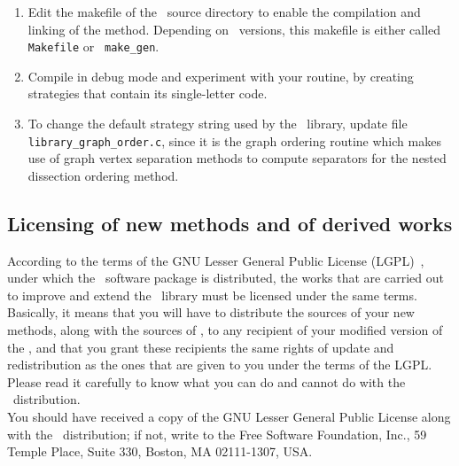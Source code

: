 \begin{enumerate}
\item
Edit the makefile of the \libscotch\ source directory to enable the
compilation and linking of the method. Depending on \libscotch\
versions, this makefile is either called {\tt Makefile} or {\tt
make\_\lbt gen}.
\item
Compile in debug mode and experiment with your routine, by creating
strategies that contain its single-letter code.
\item
To change the default strategy string used by the \libscotch\ library,
update file {\tt library\_\lbt graph\_\lbt order.c}, since it is
the graph ordering routine which makes use of graph vertex separation
methods to compute separators for the nested dissection ordering method.
\end{enumerate}

\subsection{Licensing of new methods and of derived works}

According to the terms of the GNU Lesser General Public License
(LGPL)~\cite{lgpl}, under which the \scotch\ software package is
distributed, the works that are carried out to improve and
extend the \libscotch\ library must be licensed under the same
terms. Basically, it means that you will have to distribute the
sources of your new methods, along with the sources of \scotch, to any
recipient of your modified version of the \libscotch, and that you
grant these recipients the same rights of update and redistribution as
the ones that are given to you under the terms of the LGPL. Please
read it carefully to know what you can do and cannot do with the
\scotch\ distribution.
\\

You should have received a copy of the GNU Lesser General Public
License along with the \scotch\ distribution; if not, write to the
Free Software Foundation, Inc., 59 Temple Place, Suite 330, Boston,
MA 02111-1307, USA.
